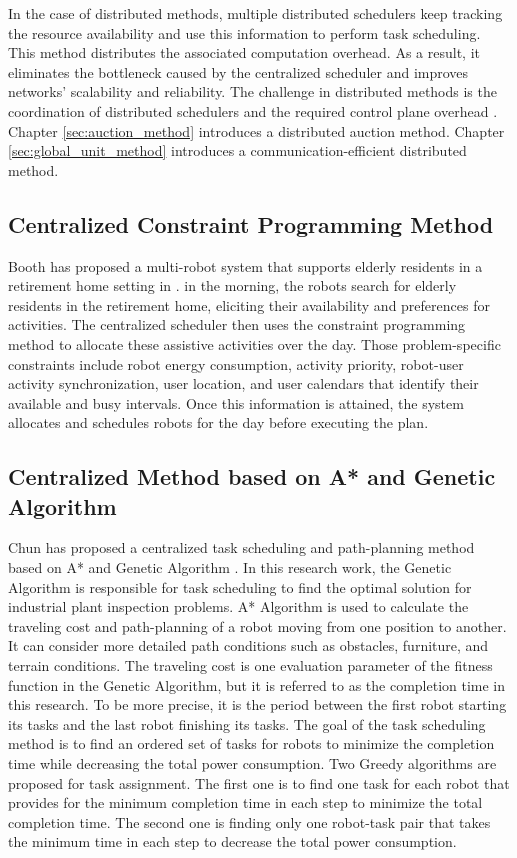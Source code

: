 In the case of distributed methods, multiple distributed schedulers keep tracking the resource availability and use this information to perform task scheduling\cite{CHRISTODOULOPOULOS20091172}. This method distributes the associated computation overhead. As a result, it eliminates the bottleneck caused by the centralized scheduler and improves networks' scalability and reliability. The challenge in distributed methods is the coordination of distributed schedulers and the required control plane overhead \cite{CHRISTODOULOPOULOS20091172}.
Chapter \ref{sec:auction_method} introduces a distributed auction method. Chapter \ref{sec:global_unit_method} introduces a communication-efficient distributed method. 

\subsection{Centralized Constraint Programming Method}
\label{sec:constraint_programming}
Booth has proposed a multi-robot system that supports elderly residents in a retirement home setting in \cite{retire2017}. in the morning, the robots search for elderly residents in the retirement home, eliciting their availability and preferences for activities. The centralized scheduler then uses the constraint programming method to allocate these assistive activities over the day. Those problem-specific constraints include robot energy consumption, activity priority, robot-user activity synchronization, user location, and user calendars that identify their available and busy intervals. Once this information is attained, the system allocates and schedules robots for the day before executing the plan.

\subsection{Centralized Method based on A* and Genetic Algorithm}
\label{sec:genetic_method}
Chun has proposed a centralized task scheduling and path-planning method based on A* and Genetic Algorithm \cite{Chun12}.
In this research work, the Genetic Algorithm is responsible for task scheduling to find the optimal solution for industrial plant inspection problems. A* Algorithm is used to calculate the traveling cost and path-planning of a robot moving from one position to another. It can consider more detailed path conditions such as obstacles, furniture, and terrain conditions. The traveling cost is one evaluation parameter of the fitness function in the Genetic Algorithm, but it is referred to as the completion time in this research. To be more precise, it is the period between the first robot starting its tasks and the last robot finishing its tasks.
The goal of the task scheduling method is to find an ordered set of tasks for robots to minimize the completion time while decreasing the total power consumption.
Two Greedy algorithms are proposed for task assignment. The first one is to find one task for each robot that provides for the minimum completion time in each step to minimize the total completion time. The second one is finding only one robot-task pair that takes the minimum time in each step to decrease the total power consumption. 

